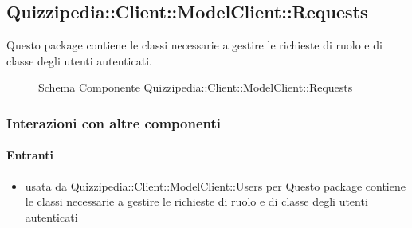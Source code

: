\subsection{Quizzipedia::Client::ModelClient::Requests}
Questo package contiene le classi necessarie a gestire le richieste di ruolo e di classe degli utenti autenticati.
\begin{figure}[H]
\centering
\noindent{}
\caption[Schema Componente Quizzipedia::Client::ModelClient::Requests]{Schema Componente Quizzipedia::Client::ModelClient::Requests}
\end{figure}
\subsubsection{Interazioni con altre componenti}
\paragraph{Entranti}
\begin{itemize}
\item usata da Quizzipedia::Client::ModelClient::Users per Questo package contiene le classi necessarie a gestire le richieste di ruolo e di classe degli utenti autenticati
\end{itemize}
